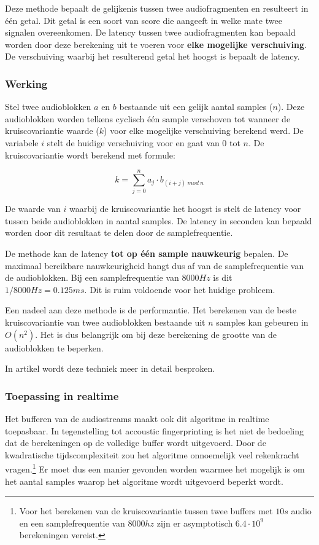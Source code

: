 Deze methode bepaalt de gelijkenis tussen twee audiofragmenten en resulteert in één getal. Dit getal is een soort van score die aangeeft in welke mate twee signalen overeenkomen. De latency tussen twee audiofragmenten kan bepaald worden door deze berekening uit te voeren voor \textbf{elke mogelijke verschuiving}. De verschuiving waarbij het resulterend getal het hoogst is bepaalt de latency.

\subsubsection{Werking}

Stel twee audioblokken $ a $ en $ b $ bestaande uit een gelijk aantal samples ($n$). Deze audioblokken worden telkens cyclisch één sample verschoven tot wanneer de kruiscovariantie waarde ($ k $) voor elke mogelijke verschuiving berekend werd. De variabele $ i $ stelt de huidige verschuiving voor en gaat van 0 tot $ n $. De kruiscovariantie wordt berekend met formule:

\begin{equation}
	k = \sum_{j=0}^{n} a_{j} \cdot b_{(i+j)\ mod\ n}
\end{equation}

De waarde van $ i $ waarbij de kruiscovariantie het hoogst is stelt de latency voor tussen beide audioblokken in aantal samples. De latency in seconden kan bepaald worden door dit resultaat te delen door de samplefrequentie.

De methode kan de latency \textbf{tot op één sample nauwkeurig} bepalen. De maximaal bereikbare nauwkeurigheid hangt dus af van de samplefrequentie van de audioblokken. Bij een samplefrequentie van $8000 Hz$ is dit $ 1/8000 Hz = 0.125 ms $. Dit is ruim voldoende voor het huidige probleem.

Een nadeel aan deze methode is de performantie. Het berekenen van de beste kruiscovariantie van twee audioblokken bestaande uit $ n $ samples kan gebeuren in  $O(n^{2})$. Het is dus belangrijk om bij deze berekening de grootte van de audioblokken te beperken.

In artikel \cite{six2015multimodal} wordt deze techniek meer in detail besproken.

\subsubsection{Toepassing in realtime}

Het bufferen van de audiostreams maakt ook dit algoritme in realtime toepasbaar. In tegenstelling tot accoustic fingerprinting is het niet de bedoeling dat de berekeningen op de volledige buffer wordt uitgevoerd. Door de kwadratische tijdscomplexiteit zou het algoritme onnoemelijk veel rekenkracht vragen.\footnote{Voor het berekenen van de kruiscovariantie tussen twee buffers met $10s$ audio en een samplefrequentie van $8000hz$ zijn er asymptotisch $ 6.4 \cdot 10^9 $ berekeningen vereist.} Er moet dus een manier gevonden worden waarmee het mogelijk is om het aantal samples waarop het algoritme wordt uitgevoerd beperkt wordt.

